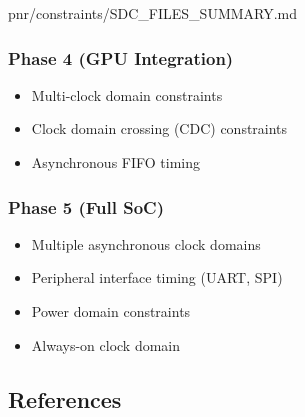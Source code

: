 \begin{relocated}{pnr/constraints/SDC_FILES_SUMMARY.md}
\subsubsection{Phase 4 (GPU Integration)}\label{tm:pd:constraints-sdc-files-summary:phase-4-gpu-integration}

\begin{itemize}
\tightlist
\item
  Multi-clock domain constraints
\item
  Clock domain crossing (CDC) constraints
\item
  Asynchronous FIFO timing
\end{itemize}

\subsubsection{Phase 5 (Full SoC)}\label{tm:pd:constraints-sdc-files-summary:phase-5-full-soc}

\begin{itemize}
\tightlist
\item
  Multiple asynchronous clock domains
\item
  Peripheral interface timing (UART, SPI)
\item
  Power domain constraints
\item
  Always-on clock domain
\end{itemize}

\subsection{References}\label{tm:pd:constraints-sdc-files-summary:references}


\end{relocated}
